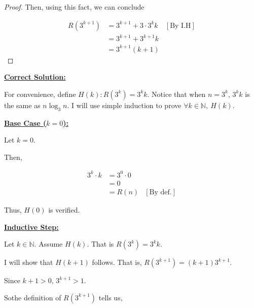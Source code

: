 \documentclass[12pt]{article}
\begin{document}
\begin{enumerate}[a.]
\begin{proof}
        \bigskip

        Then, using this fact, we can conclude

        \begin{align}
            R(3^{k+1}) &= 3^{k+1} + 3 \cdot 3^kk & [\text{By I.H}]\\
            &= 3^{k+1} + 3^{k+1}k\\
            &= 3^{k+1}(k + 1)
        \end{align}
    \end{proof}

    \bigskip

    \begin{mdframed}
        \underline{\textbf{Correct Solution:}}

        \bigskip

        For convenience, define $H(k): R(3^k) = 3^kk$. Notice that when $n = 3^k$,
        $3^kk$ is the same as $n\log_3 n$. I will use simple induction to prove
        $\forall k \in \mathbb{N},\:H(k)$.

        \bigskip

        \underline{\textbf{Base Case ($k = 0$):}}

        \bigskip

        Let $k = 0$.

        \bigskip

        Then,

        \begin{align}
            3^k \cdot k &= 3^0 \cdot 0\\
            &= 0\\
            &= R(n) & [\text{By def.}]
        \end{align}

        Thus, $H(0)$ is verified.

        \bigskip

        \underline{\textbf{Inductive Step:}}

        \bigskip

        Let $k \in \mathbb{N}$. Assume $H(k)$. That is $R(3^k) = 3^kk$.

        \bigskip

        I will show that $H(k+1)$ follows. That is, $R(3^{k+1}) = (k+1)3^{k+1}$.

        \bigskip

        \color{red}Since $k+1 > 0$, $3^{k+1} > 1$.

        \bigskip

        So\color{black}\:the definition of $R(3^{k+1})$ tells us,


\end{mdframed}
\end{enumerate}
\end{document}
